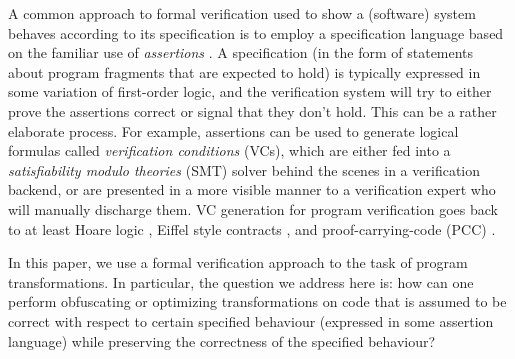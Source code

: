\documentclass[compsoc,conference,a4paper,10pt,times]{IEEEtran}
\begin{document}
A common approach to formal verification used to show a (software) system behaves according to its specification is to employ a specification language based on the familiar use of \emph{assertions} \cite{Floyd,Hoare}. A specification (in the form of statements about program fragments that are expected to hold) is typically expressed in some variation of first-order logic, and the verification system will try to either prove the assertions correct or signal that they don't hold. This can be a rather elaborate process.  For example, assertions can be used to generate logical formulas called \emph{verification conditions} (VCs), which are either fed into a \emph{satisfiability modulo theories} (SMT) solver behind the scenes in a verification backend, or are presented in a more visible manner to a verification expert who will manually discharge them. VC generation for program verification goes back to at least Hoare logic \cite{Hoare}, Eiffel style contracts \cite{Eiffel}, and proof-carrying-code (PCC) \cite{b7}.

In this paper, we use a formal verification approach to the task of program transformations.
In particular, the question we address here is:
how can one perform obfuscating or optimizing transformations on code that is assumed to be correct with respect to certain specified behaviour (expressed in some assertion language) while preserving the correctness of the specified behaviour?
\end{document}
